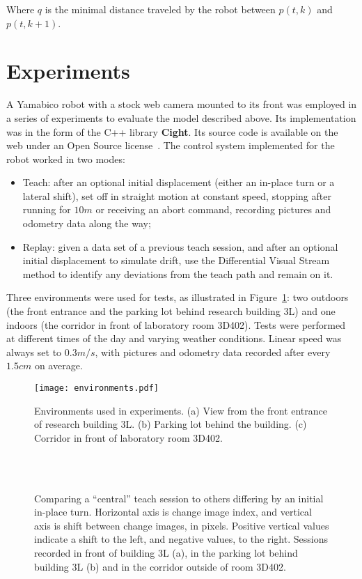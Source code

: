 \documentclass[twocolumn, 9pt,fleqn]{jsproceedings}
\begin{document}
Where $q$ is the minimal distance traveled by the robot between $p(t, k)$ and $p(t, k+1)$.

\section{Experiments}

A Yamabico robot with a stock web camera mounted to its front was employed in a series of experiments to evaluate the model described above. Its implementation was in the form of the C++ library \textbf{Cight}. Its source code is available on the web under an Open Source license~\cite{HEL14c}. The control system implemented for the robot worked in two modes:

\begin{itemize}
\item Teach: after an optional initial displacement (either an in-place turn or a lateral shift), set off in straight motion at constant speed, stopping after running for $10m$ or receiving an abort command, recording pictures and odometry data along the way;
\item Replay: given a data set of a previous teach session, and after an optional initial displacement to simulate drift, use the Differential Visual Stream method to identify any deviations from the teach path and remain on it.
\end{itemize}

Three environments were used for tests, as illustrated in Figure~\ref{fig:environments}: two outdoors (the front entrance and the parking lot behind research building 3L) and one indoors (the corridor in front of laboratory room 3D402). Tests were performed at different times of the day and varying weather conditions. Linear speed was always set to $0.3m/s$, with pictures and odometry data recorded after every $1.5cm$ on average.

\begin{figure}[h!]
\texttt{[image: environments.pdf]}
\caption{Environments used in experiments. (a) View from the front entrance of research building 3L. (b) Parking lot behind the building. (c) Corridor in front of laboratory room 3D402.}
\label{fig:environments}
\end{figure}

\begin{figure}[h!]
\\
\\
\caption{Comparing a ``central'' teach session to others differing by an initial in-place turn. Horizontal axis is change image index, and vertical axis is shift between change images, in pixels. Positive vertical values indicate a shift to the left, and negative values, to the right. Sessions recorded in front of building 3L (a), in the parking lot behind building 3L (b) and in the corridor outside of room 3D402.}
\label{fig:tests_turn}
\end{figure}
\end{document}
